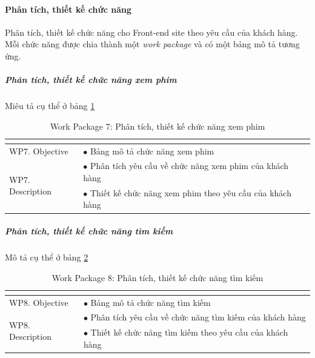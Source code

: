 \documentclass[a4paper]{book}
\begin{document}
\paragraph{Phân tích, thiết kế chức năng} Phân tích, thiết kế chức năng cho Front-end site theo yêu cầu của khách hàng. Mỗi chức năng được chia thành một \textit{work package} và có một bảng mô tả tương ứng.
\subparagraph{Phân tích, thiết kế chức năng xem phim} Miêu tả cụ thể ở bảng \ref{table:frontend_thietke_chucnang_xemphim}
\begin{table}[h!]
	\begin{center}
		\begin{tabular}{|p{4cm}|p{10cm}|}
			\hline
			\multicolumn{2}{|c|}{\cellcolor[HTML]{363636}{\color[HTML]{FFFFFF}Work package 7: Phân tích, thiết kế chức năng xem phim}}\\
			\hline
			\multirow{1}{*}{WP7. Objective} & $\bullet$ Bảng mô tả chức năng xem phim\\
			\hline
			\multirow{2}{*}{WP7. Description} & $\bullet$ Phân tích yêu cầu về chức năng xem phim của khách hàng \\
			& $\bullet$ Thiết kế chức năng xem phim theo yêu cầu của khách hàng\\
			\hline
		\end{tabular}
		\caption{Work Package 7: Phân tích, thiết kế chức năng xem phim}
		\label{table:frontend_thietke_chucnang_xemphim}
	\end{center}
\end{table}
\subparagraph{Phân tích, thiết kế chức năng tìm kiếm} Mô tả cụ thể ở bảng \ref{table:frontend_thietke_chucnang_timkiem}
\begin{table}[h!]
	\begin{center}
		\begin{tabular}{|p{4cm}|p{10cm}|}
			\hline
			\multicolumn{2}{|c|}{\cellcolor[HTML]{363636}{\color[HTML]{FFFFFF}Work package 8: Phân tích, thiết kế chức năng tìm kiếm}}\\
			\hline
			\multirow{1}{*}{WP8. Objective} & $\bullet$ Bảng mô tả chức năng tìm kiếm\\
			\hline
			\multirow{2}{*}{WP8. Description} & $\bullet$ Phân tích yêu cầu về chức năng tìm kiếm của khách hàng \\
			& $\bullet$ Thiết kế chức năng tìm kiếm theo yêu cầu của khách hàng\\
			\hline
		\end{tabular}
		\caption{Work Package 8: Phân tích, thiết kế chức năng tìm kiếm}
		\label{table:frontend_thietke_chucnang_timkiem}
	\end{center}
\end{table}
\end{document}
